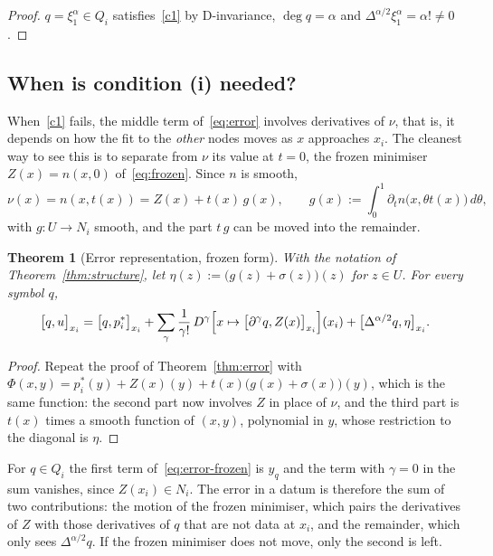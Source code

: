 \documentclass[12pt]{amsart}
\newtheorem{theorem}{Theorem}[section]
\theoremstyle{definition}
\theoremstyle{remark}
\newcommand{\fpz}[3]{\bigl[#1,#2\bigr]_{#3}}     %
\begin{document}
\begin{proof}
$q=\xi_1^\alpha\in Q_i$ satisfies~\ref{c1} by D-invariance, $\deg q=\alpha$ and
$\Delta^{\alpha/2}\xi_1^\alpha=\alpha!\ne0$.
\end{proof}

\subsection{When is condition (i) needed?}\label{sec:role-i}

When~\ref{c1} fails, the middle term of~\eqref{eq:error} involves derivatives of $\nu$, that is,
it depends on how the fit to the \emph{other} nodes moves as $x$ approaches $x_i$. The cleanest
way to see this is to separate from $\nu$ its value at $t=0$, the frozen minimiser $Z(x)=n(x,0)$
of~\eqref{eq:frozen}. Since $n$ is smooth,
\[
  \nu(x)=n(x,t(x))=Z(x)+t(x)\,g(x),\qquad g(x):=\int_0^1\partial_tn\bigl(x,\theta t(x)\bigr)\,d\theta,
\]
with $g\colon U\to N_i$ smooth, and the part $t\,g$ can be moved into the remainder.

\begin{theorem}[Error representation, frozen form]\label{thm:error-frozen}
With the notation of Theorem~\ref{thm:structure}, let $\eta(z):=\bigl(g(z)+\sigma(z)\bigr)(z)$ for
$z\in U$. For every symbol $q$,
\begin{equation}\label{eq:error-frozen}
  \fpz{q}{u}{x_i}
  =\fpz{q}{p_i^*}{x_i}
  +\sum_{\gamma}\frac{1}{\gamma!}\,D^\gamma\Bigl[x\mapsto\fpz{\partial^\gamma q}{Z(x)}{x_i}\Bigr](x_i)
  +\fpz{\Delta^{\alpha/2}q}{\eta}{x_i}.
\end{equation}
\end{theorem}

\begin{proof}
Repeat the proof of Theorem~\ref{thm:error} with
$\Phi(x,y)=p_i^*(y)+Z(x)(y)+t(x)\bigl(g(x)+\sigma(x)\bigr)(y)$, which is the same function: the
second part now involves $Z$ in place of $\nu$, and the third part is $t(x)$ times a smooth
function of $(x,y)$, polynomial in $y$, whose restriction to the diagonal is $\eta$.
\end{proof}

For $q\in Q_i$ the first term of~\eqref{eq:error-frozen} is $y_q$ and the term with $\gamma=0$ in
the sum vanishes, since $Z(x_i)\in N_i$. The error in a datum is therefore the sum of two
contributions: the motion of the frozen minimiser, which pairs the derivatives of $Z$ with
those derivatives of $q$ that are not data at $x_i$, and the remainder, which only sees
$\Delta^{\alpha/2}q$. If the frozen minimiser does not move, only the second is left.
\end{document}
